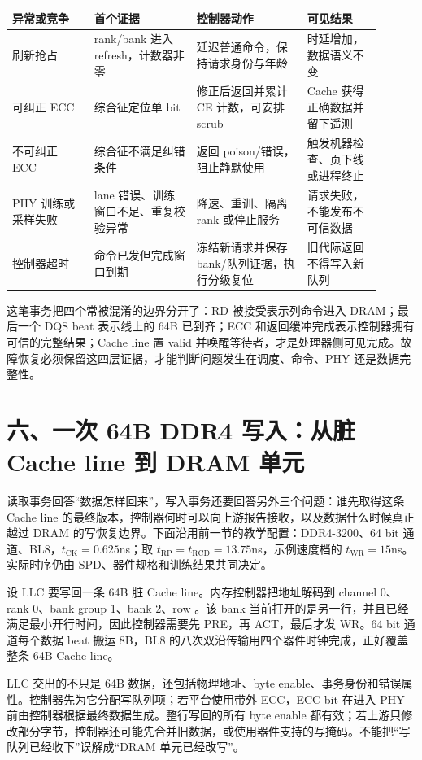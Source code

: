 \begin{longtable}{L{0.20\linewidth}L{0.25\linewidth}L{0.27\linewidth}L{0.18\linewidth}}
\toprule
异常或竞争 & 首个证据 & 控制器动作 & 可见结果 \\
\midrule
刷新抢占 & rank/bank 进入 refresh，计数器非零 & 延迟普通命令，保持请求身份与年龄 & 时延增加，数据语义不变 \\\tablerowrule
可纠正 ECC & 综合征定位单 bit & 修正后返回并累计 CE 计数，可安排 scrub & Cache 获得正确数据并留下遥测 \\\tablerowrule
不可纠正 ECC & 综合征不满足纠错条件 & 返回 poison/错误，阻止静默使用 & 触发机器检查、页下线或进程终止 \\\tablerowrule
PHY 训练或采样失败 & lane 错误、训练窗口不足、重复校验异常 & 降速、重训、隔离 rank 或停止服务 & 请求失败，不能发布不可信数据 \\\tablerowrule
控制器超时 & 命令已发但完成窗口到期 & 冻结新请求并保存 bank/队列证据，执行分级复位 & 旧代际返回不得写入新队列 \\
\bottomrule
\end{longtable}

这笔事务把四个常被混淆的边界分开了：RD 被接受表示列命令进入 DRAM；最后一个 DQS beat 表示线上的 64B 已到齐；ECC 和返回缓冲完成表示控制器拥有可信的完整结果；Cache line 置 valid 并唤醒等待者，才是处理器侧可见完成。故障恢复必须保留这四层证据，才能判断问题发生在调度、命令、PHY 还是数据完整性。
\section{六、一次 64B DDR4 写入：从脏 Cache line 到 DRAM 单元}

读取事务回答“数据怎样回来”，写入事务还要回答另外三个问题：谁先取得这条 Cache line 的最终版本，控制器何时可以向上游报告接收，以及数据什么时候真正越过 DRAM 的写恢复边界。下面沿用前一节的教学配置：DDR4-3200、64 bit 通道、BL8，$t_{\mathrm{CK}}=0.625$ns；取 $t_{\mathrm{RP}}=t_{\mathrm{RCD}}=13.75$ns，示例速度档的 $t_{\mathrm{WR}}=15$ns。实际时序仍由 SPD、器件规格和训练结果共同决定。

设 LLC 要写回一条 64B 脏 Cache line。内存控制器把地址解码到 channel 0、rank 0、bank group 1、bank 2、row 。该 bank 当前打开的是另一行，并且已经满足最小开行时间，因此控制器需要先 PRE，再 ACT，最后才发 WR。64 bit 通道每个数据 beat 搬运 8B，BL8 的八次双沿传输用四个器件时钟完成，正好覆盖整条 64B Cache line。


LLC 交出的不只是 64B 数据，还包括物理地址、byte enable、事务身份和错误属性。控制器先为它分配写队列项；若平台使用带外 ECC，ECC bit 在进入 PHY 前由控制器根据最终数据生成。整行写回的所有 byte enable 都有效；若上游只修改部分字节，控制器还可能先合并旧数据，或使用器件支持的写掩码。不能把“写队列已经收下”误解成“DRAM 单元已经改写”。

